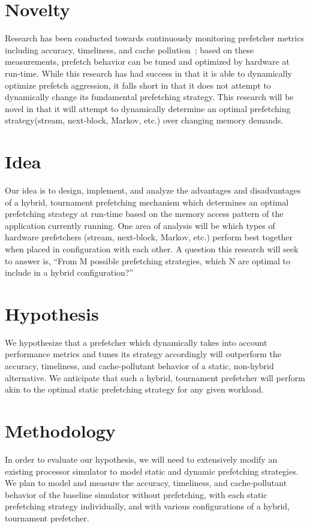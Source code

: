 \documentclass[pageno]{jpaper}
\begin{document}
\section{Novelty}

Research has been conducted towards continuously monitoring prefetcher metrics including 
accuracy, timeliness, and cache pollution~\cite{srinath07}; based on these measurements, prefetch behavior 
can be tuned and optimized by hardware at run-time. While this research has had success 
in that it is able to dynamically optimize prefetch aggression, it falls short in that 
it does not attempt to dynamically change its fundamental prefetching strategy. This research 
will be novel in that it will attempt to dynamically determine an optimal prefetching 
strategy(stream, next-block, Markov, etc.) over changing memory demands. 

\section{Idea}

Our idea is to design, implement, and analyze the advantages and disadvantages of a hybrid, 
tournament prefetching mechanism which determines an optimal prefetching strategy at run-time 
based on the memory access pattern of the application currently running. One area of analysis 
will be which types of hardware prefetchers (stream, next-block, Markov, etc.) perform best 
together when placed in configuration with each other. A question this research will seek to 
answer is, “From M possible prefetching strategies, which N are optimal to include in a 
hybrid configuration?”

\section{Hypothesis}

We hypothesize that a prefetcher which dynamically takes into account performance metrics 
and tunes its strategy accordingly will outperform the accuracy, timeliness, and cache-pollutant 
behavior of a static, non-hybrid alternative. We anticipate that such a hybrid, tournament 
prefetcher will perform akin to the optimal static prefetching strategy for any given workload.

\section{Methodology}

In order to evaluate our hypothesis, we will need to extensively modify an existing processor 
simulator to model static and dynamic prefetching strategies. We plan to model and measure the 
accuracy, timeliness, and cache-pollutant behavior of the baseline simulator without prefetching, 
with each static prefetching strategy individually, and with various configurations of a hybrid, 
tournament prefetcher.
\end{document}
